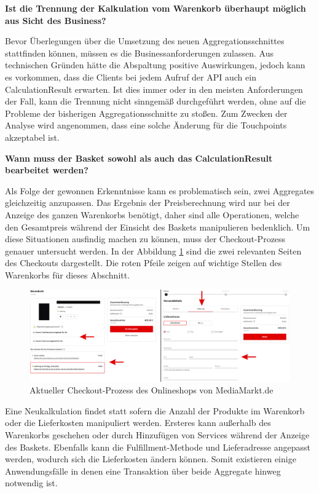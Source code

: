 \textbf{Ist die Trennung der Kalkulation vom Warenkorb überhaupt möglich aus Sicht des Business?}

Bevor Überlegungen über die Umsetzung des neuen Aggregationsschnittes stattfinden können, müssen es die Businessanforderungen zulassen. Aus technischen Gründen hätte die Abspaltung positive Auswirkungen, jedoch kann es vorkommen, dass die Clients bei jedem Aufruf der API auch ein CalculationResult erwarten. Ist dies immer oder in den meisten Anforderungen der Fall, kann die Trennung nicht sinngemäß durchgeführt werden, ohne auf die Probleme der bisherigen Aggregationsschnitte zu stoßen. Zum Zwecken der Analyse wird angenommen, dass eine solche Änderung für die Touchpoints akzeptabel ist.

\textbf{Wann muss der Basket sowohl als auch das CalculationResult bearbeitet werden?}


Als Folge der gewonnen Erkenntnisse kann es problematisch sein, zwei Aggregates gleichzeitig anzupassen. Das Ergebnis der Preisberechnung wird nur bei der Anzeige des ganzen Warenkorbs benötigt, daher sind alle Operationen, welche den Gesamtpreis während der Einsicht des Baskets manipulieren bedenklich. Um diese Situationen ausfindig machen zu können, muss der Checkout-Prozess genauer untersucht werden. In der Abbildung \ref{fig:Checkout-Process} sind die zwei relevanten Seiten des Checkouts dargestellt. Die roten Pfeile zeigen auf wichtige Stellen des Warenkorbs für dieses Abschnitt.

\vspace{0.5cm}
\begin{figure}[htbp]
	\centering
	\includegraphics[width=\linewidth]{bilder/Checkout.png}
	\caption{Aktueller Checkout-Prozess des Onlineshops von MediaMarkt.de}
	\label{fig:Checkout-Process}
\end{figure}

Eine Neukalkulation findet statt sofern die Anzahl der Produkte im Warenkorb oder die Lieferkosten manipuliert werden. Ersteres kann außerhalb des Warenkorbs geschehen oder durch Hinzufügen von Services während der Anzeige des Baskets. Ebenfalls kann die Fulfillment-Methode und Lieferadresse angepasst werden, wodurch sich die Lieferkosten ändern können. Somit existieren einige Anwendungsfälle in denen eine Transaktion über beide Aggregate hinweg notwendig ist.

